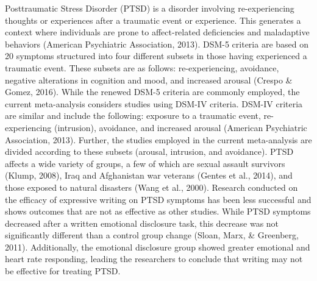 \documentclass[english,man, mask]{apa6}
\theoremstyle{definition}
\theoremstyle{definition}
\theoremstyle{definition}
\theoremstyle{remark}
\begin{document}
Posttraumatic Stress Disorder (PTSD) is a disorder involving
re-experiencing thoughts or experiences after a traumatic event or
experience. This generates a context where individuals are prone to
affect-related deficiencies and maladaptive behaviors (American
Psychiatric Association, 2013). DSM-5 criteria are based on 20 symptoms
structured into four different subsets in those having experienced a
traumatic event. These subsets are as follows: re-experiencing,
avoidance, negative alterations in cognition and mood, and increased
arousal (Crespo \& Gomez, 2016). While the renewed DSM-5 criteria are
commonly employed, the current meta-analysis considers studies using
DSM-IV criteria. DSM-IV criteria are similar and include the following:
exposure to a traumatic event, re-experiencing (intrusion), avoidance,
and increased arousal (American Psychiatric Association, 2013). Further,
the studies employed in the current meta-analysis are divided according
to these subsets (arousal, intrusion, and avoidance). PTSD affects a
wide variety of groups, a few of which are sexual assault survivors
(Klump, 2008), Iraq and Afghanistan war veterans (Gentes et al., 2014),
and those exposed to natural disasters (Wang et al., 2000). Research
conducted on the efficacy of expressive writing on PTSD symptoms has
been less successful and shows outcomes that are not as effective as
other studies. While PTSD symptoms decreased after a written emotional
disclosure task, this decrease was not significantly different than a
control group change (Sloan, Marx, \& Greenberg, 2011). Additionally,
the emotional disclosure group showed greater emotional and heart rate
responding, leading the researchers to conclude that writing may not be
effective for treating PTSD.
\end{document}
